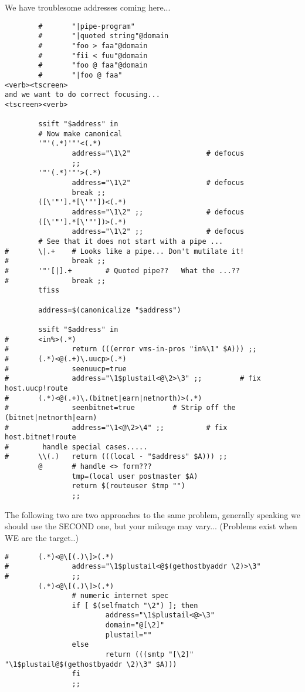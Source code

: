 We have troublesome addresses coming here...
\begin{tscreen}
\begin{verbatim}
        #       "|pipe-program"
        #       "|quoted string"@domain
        #       "foo > faa"@domain
        #       "fii < fuu"@domain
        #       "foo @ faa"@domain
        #       "|foo @ faa"
<verb><tscreen>
and we want to do correct focusing...
<tscreen><verb>

        ssift "$address" in
        # Now make canonical
        '"'(.*)'"'<(.*)
                address="\1\2"                  # defocus
                ;;
        '"'(.*)'"'>(.*)
                address="\1\2"                  # defocus
                break ;;
        ([\'"'].*[\'"'])<(.*)
                address="\1\2" ;;               # defocus
        ([\'"'].*[\'"'])>(.*)
                address="\1\2" ;;               # defocus
        # See that it does not start with a pipe ...
#       \|.+    # Looks like a pipe... Don't mutilate it!
#               break ;;
#       '"'[|].+        # Quoted pipe??   What the ...??
#               break ;;
        tfiss

        address=$(canonicalize "$address")

        ssift "$address" in
#       <in%>(.*)
#               return (((error vms-in-pros "in%\1" $A))) ;;
#       (.*)<@(.+)\.uucp>(.*)
#               seenuucp=true
#               address="\1$plustail<@\2>\3" ;;         # fix host.uucp!route
#       (.*)<@(.+)\.(bitnet|earn|netnorth)>(.*)
#               seenbitnet=true         # Strip off the (bitnet|netnorth|earn)
#               address="\1<@\2>\4" ;;          # fix host.bitnet!route
#        handle special cases.....
#       \\(.)   return (((local - "$address" $A))) ;;
        @       # handle <> form???
                tmp=(local user postmaster $A)
                return $(routeuser $tmp "")
                ;;
\end{verbatim}
\end{tscreen}


The following two are two approaches to the same problem, generally
speaking we should use the SECOND one, but your mileage may vary...
(Problems exist when WE are the target..)

\begin{tscreen}
\begin{verbatim}
#       (.*)<@\[(.)\]>(.*)
#               address="\1$plustail<@$(gethostbyaddr \2)>\3"
#               ;;
        (.*)<@\[(.)\]>(.*)
                # numeric internet spec
                if [ $(selfmatch "\2") ]; then
                        address="\1$plustail<@>\3"
                        domain="@[\2]"
                        plustail=""
                else
                        return (((smtp "[\2]" "\1$plustail@$(gethostbyaddr \2)\3" $A)))
                fi
                ;;
\end{verbatim}
\end{tscreen}


